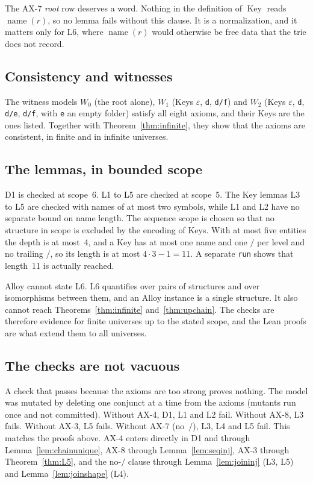 \documentclass[11pt,a4paper]{article}
\newcommand{\sep}{\mathord{/}}              %
\newcommand{\eps}{\varepsilon}
\newcommand{\nm}{\operatorname{name}}
\newcommand{\Key}{\operatorname{Key}}
\theoremstyle{plain}
\theoremstyle{definition}
\theoremstyle{remark}
\begin{document}
The AX-7 \emph{root} row deserves a word. Nothing in the definition of $\Key$
reads $\nm(r)$, so no lemma fails without this clause. It is a normalization,
and it matters only for L6, where $\nm(r)$ would otherwise be free data that
the trie does not record.

\subsection{Consistency and witnesses}
The witness models $W_0$ (the root alone), $W_1$ (Keys $\eps$, \texttt{d},
\texttt{d/f}) and $W_2$ (Keys $\eps$, \texttt{d}, \texttt{d/e},
\texttt{d/f}, with \texttt{e} an empty folder) satisfy all eight axioms, and
their Keys are the ones listed. Together with Theorem~\ref{thm:infinite}, they
show that the axioms are consistent, in finite and in infinite universes.

\subsection{The lemmas, in bounded scope}
D1 is checked at scope~6. L1 to L5 are checked at scope~5. The Key lemmas L3 to
L5 are checked with names of at most two symbols, while L1 and L2 have no
separate bound on name length. The sequence scope is chosen so that no structure in scope is
excluded by the encoding of Keys. With at most five entities the depth is at
most~4, and a Key has at most one name and one $\sep$ per level and no
trailing $\sep$, so its length is at most $4\cdot3-1=11$. A separate
\texttt{run} shows that length~11 is actually reached.

Alloy cannot state L6. L6 quantifies over pairs of structures and over
isomorphisms between them, and an Alloy instance is a single structure. It
also cannot reach Theorems~\ref{thm:infinite} and~\ref{thm:upchain}. The checks are
therefore evidence for finite universes up to the stated scope, and the Lean
proofs are what extend them to all universes.

\subsection{The checks are not vacuous}
A check that passes because the axioms are too strong proves nothing. The
model was mutated by deleting one conjunct at a time from the axioms
(mutants run once and not committed). Without AX-4, D1, L1 and L2 fail.
Without AX-8, L3 fails. Without AX-3, L5 fails. Without AX-7 (no~$\sep$),
L3, L4 and L5 fail. This matches the proofs above. AX-4 enters directly in D1 and through
Lemma~\ref{lem:chainunique}, AX-8 through Lemma~\ref{lem:seqinj}, AX-3 through
Theorem~\ref{thm:L5}, and the no-$\sep$ clause through
Lemma~\ref{lem:joininj} (L3, L5) and Lemma~\ref{lem:joinshape} (L4).
\end{document}
